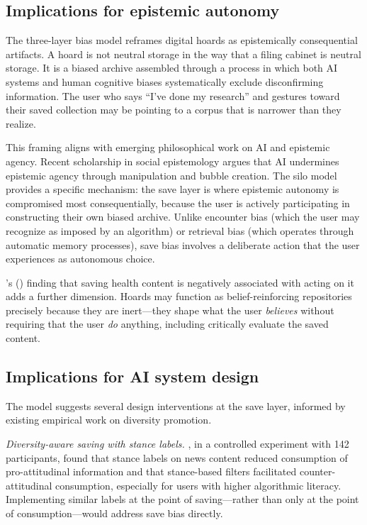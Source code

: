 \documentclass[12pt,a4paper]{article}
\begin{document}
\subsection{Implications for epistemic autonomy}

The three-layer bias model reframes digital hoards as epistemically consequential artifacts.
A hoard is not neutral storage in the way that a filing cabinet is neutral storage.
It is a biased archive assembled through a process in which both AI systems and human cognitive biases systematically exclude disconfirming information.
The user who says ``I've done my research'' and gestures toward their saved collection may be pointing to a corpus that is narrower than they realize.

This framing aligns with emerging philosophical work on AI and epistemic agency.
Recent scholarship in social epistemology argues that AI undermines epistemic agency through manipulation and bubble creation.
The silo model provides a specific mechanism: the save layer is where epistemic autonomy is compromised most consequentially, because the user is actively participating in constructing their own biased archive.
Unlike encounter bias (which the user may recognize as imposed by an algorithm) or retrieval bias (which operates through automatic memory processes), save bias involves a deliberate action that the user experiences as autonomous choice.

\citeauthor{Huang2025}'s (\citeyear{Huang2025}) finding that saving health content is negatively associated with acting on it adds a further dimension.
Hoards may function as belief-reinforcing repositories precisely because they are inert---they shape what the user \emph{believes} without requiring that the user \emph{do} anything, including critically evaluate the saved content.


\subsection{Implications for AI system design}

The model suggests several design interventions at the save layer, informed by existing empirical work on diversity promotion.

\emph{Diversity-aware saving with stance labels.}
\citet{Jiang2025}, in a controlled experiment with 142 participants, found that stance labels on news content reduced consumption of pro-attitudinal information and that stance-based filters facilitated counter-attitudinal consumption, especially for users with higher algorithmic literacy.
Implementing similar labels at the point of saving---rather than only at the point of consumption---would address save bias directly.
\end{document}
